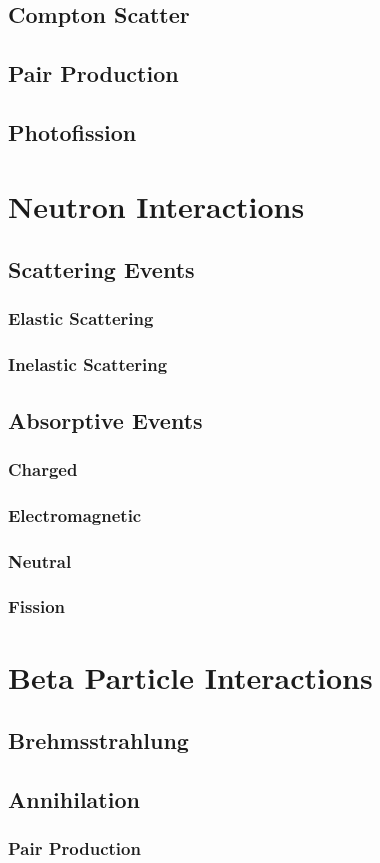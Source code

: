 \subsection{Compton Scatter}
\subsection{Pair Production}
\subsection{Photofission}

\section{Neutron Interactions}
\subsection{Scattering Events}
\subsubsection{Elastic Scattering}
\subsubsection{Inelastic Scattering}
\subsection{Absorptive Events}
\subsubsection{Charged}
\subsubsection{Electromagnetic}
\subsubsection{Neutral}
\subsubsection{Fission}

\section{Beta Particle Interactions}
\subsection{Brehmsstrahlung}
\subsection{Annihilation}
\subsubsection{Pair Production}







